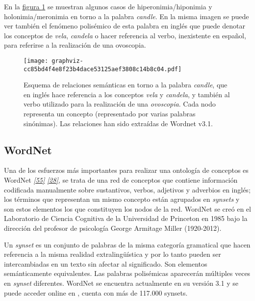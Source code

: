 \documentclass[a4paper,12pt,spanish]{book}
\begin{document}
En la \hyperref[1.state-of-the-art/i.representacion-conocimiento:fig-wordnet-lightning]{figura  \ref*{1.state-of-the-art/i.representacion-conocimiento:fig-wordnet-lightning}} se muestran algunos casos de hiperonimia/hiponimia y
holonimia/meronimia en torno a la palabra \emph{candle}. En la misma imagen se puede ver también el
fenómeno polisémico de esta palabra en inglés que puede denotar los conceptos de \emph{vela}, \emph{candela}
o hacer referencia al verbo, inexistente en español, para referirse a la realización de una
ovoscopia.
\begin{figure}[htbp]
\centering
\capstart

\texttt{[image: graphviz-cc85bd4f4e8f23b4dace53125aef3808c14b8c04.pdf]}
\caption[Estructura de relaciones semánticas de WordNet en torno a la palabra *candle*.]{Esquema de relaciones semánticas en torno a la palabra \emph{candle}, que en inglés hace referencia a los conceptos \emph{vela} y \emph{candela}, y también al verbo utilizado para la realización de una \emph{ovoscopia}. Cada nodo representa un concepto (representado por varias palabras sinónimas). Las relaciones han sido extraídas de Wordnet v3.1.}\label{1.state-of-the-art/i.representacion-conocimiento:fig-wordnet-lightning}\end{figure}


\subsection{WordNet}
\label{1.state-of-the-art/i.representacion-conocimiento:id27}\label{1.state-of-the-art/i.representacion-conocimiento:wordnet}
Una de los esfuerzos más importantes para realizar una ontología de conceptos es WordNet
\label{1.state-of-the-art/i.representacion-conocimiento:id28}{\hyperref[zreferences:miller1990]{\emph{{[}55{]}}}} \label{1.state-of-the-art/i.representacion-conocimiento:id29}{\hyperref[zreferences:fellbaum1998]{\emph{{[}28{]}}}}, se trata de una red de conceptos que contiene
información codificada manualmente sobre sustantivos, verbos, adjetivos y adverbios
en inglés; los términos que representan un mismo concepto están agrupados en \emph{synsets} y
son estos elementos los que constituyen los nodos de la red.
WordNet se creó en el Laboratorio de Ciencia Cognitiva de la Universidad de Princeton en
1985 bajo la dirección del profesor de psicología George Armitage Miller (1920-2012).

Un \emph{synset} es un conjunto de palabras de la misma categoría gramatical que hacen
referencia a la misma realidad extralingüística y por lo tanto pueden ser intercambiadas
en un texto sin afectar al significado. Son elementos semánticamente equivalentes.
Las palabras polisémicas aparecerán múltiples veces en \emph{synset} diferentes.
WordNet se encuentra actualmente en su versión 3.1 y se puede acceder online en
, cuenta con más de 117.000 synsets.
\end{document}
